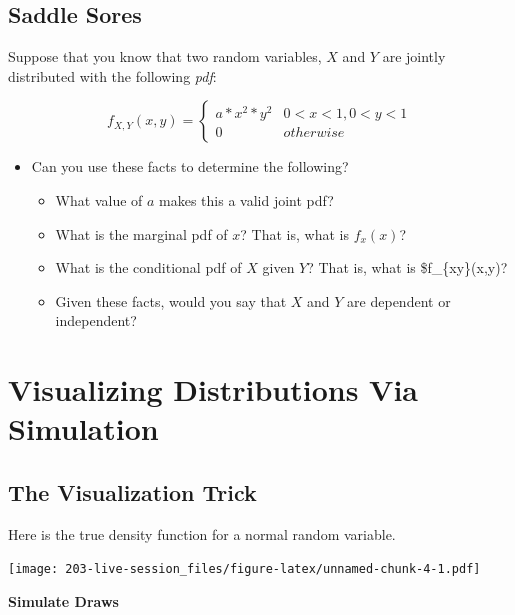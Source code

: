 \documentclass[
]{book}
\providecommand{\tightlist}{%
  \setlength{\itemsep}{0pt}\setlength{\parskip}{0pt}}
\theoremstyle{definition}
\theoremstyle{definition}
\theoremstyle{definition}
\theoremstyle{definition}
\theoremstyle{remark}
\begin{document}
\hypertarget{saddle-sores}{%
\subsection{Saddle Sores}\label{saddle-sores}}

Suppose that you know that two random variables, \(X\) and \(Y\) are jointly distributed with the following \emph{pdf}:

\[
f_{X,Y}(x,y) = 
  \begin{cases}
    a * x^{2} * y^{2} & 0 < x < 1, 0 < y < 1 \\
    0 & otherwise
  \end{cases}
\]

\begin{itemize}
\tightlist
\item
  Can you use these facts to determine the following?

  \begin{itemize}
  \tightlist
  \item
    What value of \(a\) makes this a valid joint pdf?
  \item
    What is the marginal pdf of \(x\)? That is, what is \(f_{x}(x)\)?
  \item
    What is the conditional pdf of \(X\) given \(Y\)? That is, what is \$f\_\{x\textbar y\}(x,y)?
  \item
    Given these facts, would you say that \(X\) and \(Y\) are dependent or independent?
  \end{itemize}
\end{itemize}

\hypertarget{visualizing-distributions-via-simulation}{%
\section{Visualizing Distributions Via Simulation}\label{visualizing-distributions-via-simulation}}

\hypertarget{the-visualization-trick}{%
\subsection{The Visualization Trick}\label{the-visualization-trick}}

Here is the true density function for a normal random variable.

\texttt{[image: 203-live-session\_files/figure-latex/unnamed-chunk-4-1.pdf]}

\textbf{Simulate Draws}
\end{document}
